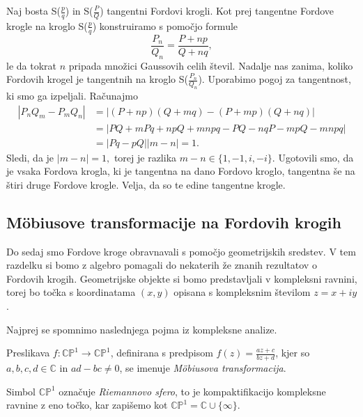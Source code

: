\documentclass[mat1]{fmfdelo}
\begin{document}
Naj bosta S($\frac{p}{q}$) in S($\frac{P}{Q}$) tangentni Fordovi krogli. Kot prej tangentne Fordove krogle na kroglo S($\frac{p}{q}$) konstruiramo s pomočjo formule
\begin{equation}
\frac{P_n}{Q_n} = \frac{P+np}{Q+nq},
\end{equation}
le da tokrat $n$ pripada množici Gaussovih celih števil. 
Nadalje nas zanima, koliko Fordovih krogel je tangentnih na kroglo S($\frac{P_n}{Q_n}$).
Uporabimo pogoj za tangentnost, ki smo ga izpeljali. Računajmo
\begin{align} 
|P_{n}Q_{m} - P_{m}Q_{n}| 
  &= |(P+np)(Q+mq) - (P+mp)(Q+nq)| \nonumber \\
  &= |PQ+mPq+npQ+mnpq-PQ-nqP-mpQ-mnpq| \nonumber \\
  &= |Pq-pQ| |m-n| = 1.
\end{align}
%
Sledi, da je $|m-n|=1,$ torej je razlika $m-n \in \{1, -1, i, -i \}.$ Ugotovili smo, da je vsaka Fordova krogla, ki je tangentna na dano Fordovo kroglo, tangentna še na štiri druge Fordove krogle. Velja, da so te edine tangentne krogle.

\subsection{M\"{o}biusove transformacije na Fordovih krogih}

Do sedaj smo Fordove kroge obravnavali s pomočjo geometrijskih sredstev. V tem razdelku si bomo z algebro pomagali do nekaterih že znanih rezultatov o Fordovih krogih.
Geometrijske objekte si bomo predstavljali v kompleksni ravnini, torej bo točka s koordinatama $(x,y)$ opisana s kompleksnim številom $z=x+iy$.

Najprej se spomnimo naslednjega pojma iz kompleksne analize.
\begin{definicija}
\label{def:MobTransformacija}
Preslikava \( f \colon \mathbb{CP}^{1} \rightarrow \mathbb{CP}^{1} \), definirana s predpisom \( f(z) = \frac{az+c}{bz+d} \), kjer so $a,b,c,d \in \mathbb{C}$ in $ad-bc \neq 0$, se imenuje \emph{M\"{o}biusova transformacija}.
\end{definicija} 

\begin{opomba}
Simbol $ \mathbb{CP}^{1}$ označuje \emph{Riemannovo sfero}, to je kompaktifikacijo kompleksne ravnine z eno točko, kar zapišemo kot $\mathbb{CP}^{1} = \mathbb{C} \cup \{\infty\}$.
\end{opomba}
\end{document}

